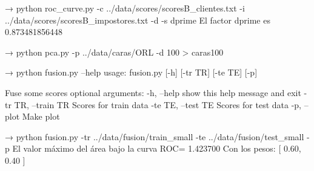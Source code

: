 → python roc_curve.py -c ../data/scores/scoresB_clientes.txt -i ../data/scores/scoresB_impostores.txt  -d -s dprime
El factor dprime es 0.873481856448



→ python pca.py -p ../data/caras/ORL -d 100 > caras100




→ python fusion.py --help                         
usage: fusion.py [-h] [-tr TR] [-te TE] [-p]

Fuse some scores
optional arguments:
  -h, --help          show this help message and exit
  -tr TR, --train TR  Scores for train data
  -te TE, --test TE   Scores for test data
  -p, --plot          Make plot

→ python fusion.py -tr ../data/fusion/train_small -te ../data/fusion/test_small -p
El valor máximo del área bajo la curva ROC= 1.423700 
Con los pesos:
  [ 0.60, 0.40 ]
                 
